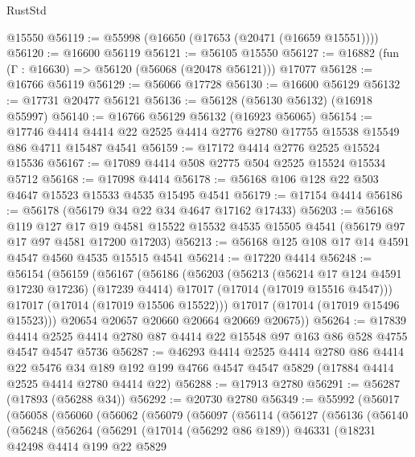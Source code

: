 \begin{lexlean}{RustStd}
\begin{coremodule}
    @15550
@56119 := @55998 (@16650 (@17653 (@20471 (@16659 @15551))))
@56120 := @16600 @56119
@56121 := @56105 @15550
@56127 := @16882 (fun (Γ : @16630) => @56120 (@56068 (@20478 @56121))) @17077
@56128 := @16766 @56119
@56129 := @56066 @17728
@56130 := @16600 @56129
@56132 := @17731 @20477 @56121
@56136 := @56128 (@56130 @56132) (@16918 @55997)
@56140 := @16766 @56129 @56132 (@16923 @56065)
@56154 := @17746 @4414 @4414 @22 @2525 @4414 @2776 @2780 @17755 @15538 @15549 @86 @4711 @15487 @4541
@56159 := @17172 @4414 @2776 @2525 @15524 @15536
@56167 := @17089 @4414 @508 @2775 @504 @2525 @15524 @15534 @5712
@56168 := @17098 @4414
@56178 := @56168 @106 @128 @22 @503 @4647 @15523 @15533 @4535 @15495 @4541
@56179 := @17154 @4414
@56186 := @56178 (@56179 @34 @22 @34 @4647 @17162 @17433)
@56203 := @56168
    @119
    @127
    @17
    @19
    @4581
    @15522
    @15532
    @4535
    @15505
    @4541
    (@56179 @97 @17 @97 @4581 @17200 @17203)
@56213 := @56168 @125 @108 @17 @14 @4591 @4547 @4560 @4535 @15515 @4541
@56214 := @17220 @4414
@56248 := @56154
    (@56159
      (@56167
        (@56186
          (@56203
            (@56213
              (@56214 @17 @124 @4591 @17230 @17236)
              (@17239 @4414)
              @17017
              (@17014 (@17019 @15516 @4547)))
            @17017
            (@17014 (@17019 @15506 @15522)))
          @17017
          (@17014 (@17019 @15496 @15523)))
        @20654
        @20657
        @20660
        @20664
        @20669
        @20675))
@56264 := @17839
    @4414
    @2525
    @4414
    @2780
    @87
    @4414
    @22
    @15548
    @97
    @163
    @86
    @528
    @4755
    @4547
    @4547
    @5736
@56287 := @46293
    @4414
    @2525
    @4414
    @2780
    @86
    @4414
    @22
    @5476
    @34
    @189
    @192
    @199
    @4766
    @4547
    @4547
    @5829
    (@17884 @4414 @2525 @4414 @2780 @4414 @22)
@56288 := @17913 @2780
@56291 := @56287 (@17893 (@56288 @34))
@56292 := @20730 @2780
@56349 := @55992
    (@56017
      (@56058
        (@56060
          (@56062
            (@56079
              (@56097
                (@56114
                  (@56127
                    (@56136
                      (@56140
                        (@56248
                          (@56264
                            (@56291
                              (@17014 (@56292 @86 @189))
                              @46331
                              (@18231
                                @42498
                                @4414
                                @199
                                @22
                                @5829

\end{coremodule}
\end{lexlean}
